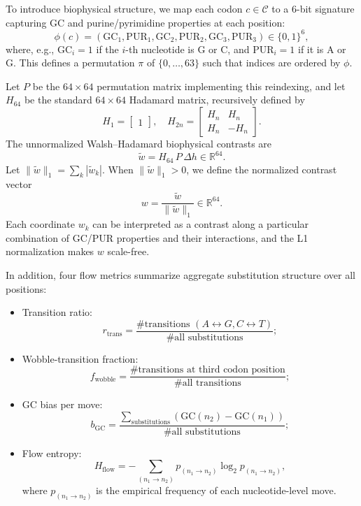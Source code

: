 \documentclass[11pt]{article}
\begin{document}
To introduce biophysical structure, we map each codon $c\in\mathcal{C}$ to a 6-bit signature capturing GC and purine/pyrimidine properties at each position:
\begin{equation}
 \phi(c) = (\mathrm{GC}_1,\mathrm{PUR}_1,\mathrm{GC}_2,\mathrm{PUR}_2,\mathrm{GC}_3,\mathrm{PUR}_3) \in \{0,1\}^6,
\end{equation}
where, e.g., $\mathrm{GC}_i = 1$ if the $i$-th nucleotide is G or C, and $\mathrm{PUR}_i = 1$ if it is A or G.\cite{codoncontrast} This defines a permutation $\pi$ of $\{0,\dots,63\}$ such that indices are ordered by $\phi$.

Let $P$ be the $64\times 64$ permutation matrix implementing this reindexing, and let $H_{64}$ be the standard $64\times 64$ Hadamard matrix, recursively defined by
\begin{equation}
H_1 = \begin{bmatrix}1\end{bmatrix}, \quad
H_{2n} = \begin{bmatrix}H_n & H_n\\ H_n & -H_n\end{bmatrix}.
\end{equation}
The unnormalized Walsh--Hadamard biophysical contrasts are
\begin{equation}
  \tilde{w} = H_{64}\, P\, \Delta h \in \mathbb{R}^{64}.
\end{equation}
Let $\|\tilde{w}\|_1 = \sum_{k}|\tilde{w}_k|$. When $\|\tilde{w}\|_1>0$, we define the normalized contrast vector
\begin{equation}
  w = \frac{\tilde{w}}{\|\tilde{w}\|_1} \in \mathbb{R}^{64}.
\end{equation}
Each coordinate $w_k$ can be interpreted as a contrast along a particular combination of GC/PUR properties and their interactions, and the L1 normalization makes $w$ scale-free.\cite{codoncontrast}

In addition, four flow metrics summarize aggregate substitution structure over all positions:
\begin{itemize}
 \item Transition ratio:
       \[
       r_{\text{trans}} = \frac{\#\text{transitions }(A\leftrightarrow G, C\leftrightarrow T)}{\#\text{all substitutions}};
       \]
 \item Wobble-transition fraction:
       \[
       f_{\text{wobble}} = \frac{\#\text{transitions at third codon position}}{\#\text{all transitions}};
       \]
 \item GC bias per move:
       \[
       b_{\text{GC}} = \frac{\sum_{\text{substitutions}} (\mathrm{GC}(n_2) - \mathrm{GC}(n_1))}{\#\text{all substitutions}};
       \]
 \item Flow entropy:
       \[
       H_{\text{flow}} = -\sum_{(n_1\to n_2)} p_{(n_1\to n_2)} \log_2 p_{(n_1\to n_2)},
       \]
       where $p_{(n_1\to n_2)}$ is the empirical frequency of each nucleotide-level move.\cite{codoncontrast}
\end{itemize}
\end{document}
